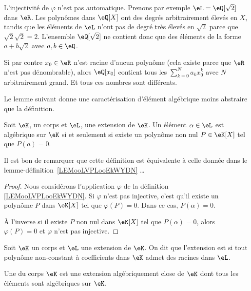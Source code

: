 \begin{example}
    L'injectivité de \( \varphi\) n'est pas automatique. Prenons par exemple \( \eL=\eQ[\sqrt{ 2 }]\) dans \( \eR\). Les polynômes dans \( \eQ[X]\) ont des degrés arbitrairement élevés en \( X\), tandis que les éléments de \( \eL\) n'ont pas de degré très élevés en \( \sqrt{ 2 }\) parce que \( \sqrt{ 2 }\sqrt{ 2 }=2\). L'ensemble \( \eQ[\sqrt{ 2 }]\) ne contient donc que des éléments de la forme \( a+b\sqrt{ 2 }\) avec \( a,b\in \eQ\).

    Si par contre \( x_0\in \eR\) n'est racine d'aucun polynôme (cela existe parce que \( \eR\) n'est pas dénombrable), alors \( \eQ[x_0]\) contient tous les \( \sum_{k=0}^Na_kx_0^k\) avec \( N\) arbitrairement grand. Et tous ces nombres sont différents.
\end{example}

Le lemme suivant donne une caractérisation d'élément algébrique moins abstraire que la définition.
\begin{lemma} 
    Soit \( \eK\), un corps et \( \eL\), une extension de \( \eK\). Un élément \( \alpha\in \eL\) est algébrique sur \( \eK\) si et seulement si existe un polynôme non nul \( P\in \eK[X]\) tel que \( P(a)=0\).
    
Il est bon de remarquer que cette définition est équivalente à celle donnée dans le lemme-définition~\ref{LEMooLVPLooEkWYDN} \dots
\end{lemma}

\begin{proof}
    Nous considérons l'application \( \varphi\) de la définition \ref{LEMooLVPLooEkWYDN}. Si \( \varphi\) n'est pas injective, c'est qu'il existe un polynôme \( P\) dans \( \eK[X]\) tel que \( \varphi(P)=0\). Dans ce cas, \( P(\alpha)=0\).

    À l'inverse si il existe \( P\) non nul dans \( \eK[X]\) tel que \( P(\alpha)=0\), alors \( \varphi(P)=0\) et \( \varphi\) n'est pas injective.
\end{proof}

\begin{definition}
    Soit \( \eK\) un corps et \( \eL \) une extension de \( \eK \). On dit que l'extension est  si tout polynôme non-constant à coefficients dans \( \eK\) admet des racines dans \( \eL \).
\end{definition}

\begin{definition}
    Une  du corps \( \eK\) est une extension algébriquement close de \( \eK\) dont tous les éléments sont algébriques sur \( \eK\).
\end{definition}

